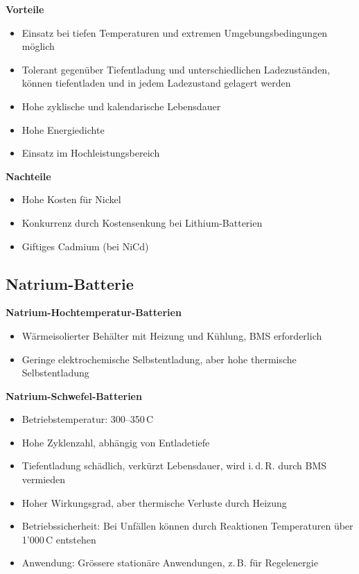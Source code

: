 \begin{minipage}{0.48\textwidth}
\textbf{Vorteile}
\begin{itemize}
  \item Einsatz bei tiefen Temperaturen und extremen Umgebungsbedingungen möglich
  \item Tolerant gegenüber Tiefentladung und unterschiedlichen Ladezuständen, können tiefentladen und in jedem Ladezustand gelagert werden
  \item Hohe zyklische und kalendarische Lebensdauer
  \item Hohe Energiedichte
  \item Einsatz im Hochleistungsbereich
\end{itemize}
\end{minipage}
\hfill
\begin{minipage}{0.48\textwidth}
\textbf{Nachteile}
\begin{itemize}
  \item Hohe Kosten für Nickel
  \item Konkurrenz durch Kostensenkung bei Lithium-Batterien
  \item Giftiges Cadmium (bei NiCd)
\end{itemize}
\end{minipage}


\columnbreak
\subsection{Natrium-Batterie}


\textbf{Natrium-Hochtemperatur-Batterien}
  \begin{itemize}
    \item Wärmeisolierter Behälter mit Heizung und Kühlung, BMS erforderlich
    \item Geringe elektrochemische Selbstentladung, aber hohe \glqq thermische Selbstentladung\grqq
  \end{itemize}

\textbf{Natrium-Schwefel-Batterien}
  \begin{itemize}
    \item Betriebstemperatur: 300--350\,\textdegree C
    \item Hohe Zyklenzahl, abhängig von Entladetiefe
    \item Tiefentladung schädlich, verkürzt Lebensdauer, wird i.\,d.\,R. durch BMS vermieden
    \item Hoher Wirkungsgrad, aber thermische Verluste durch Heizung
    \item Betriebssicherheit: Bei Unfällen können durch Reaktionen Temperaturen über 1'000\,\textdegree C entstehen
    \item Anwendung: Grössere stationäre Anwendungen, z.\,B. für Regelenergie
    \end{itemize}

